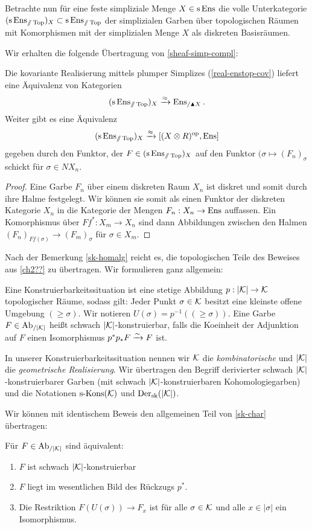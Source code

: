 Betrachte nun für eine feste simpliziale Menge $X \in \operatorname{s}\operatorname{Ens}$ die
volle Unterkategorie $(\operatorname{s}\operatorname{Ens}_{\mathbin{/\mkern-6mu/} \operatorname{Top}})_X \subset \operatorname{s}\operatorname{Ens}_{\mathbin{/\mkern-6mu/} \operatorname{Top}}$ der
simplizialen Garben über topologischen Räumen mit Komorphismen mit der
simplizialen Menge $X$ als diskreten Basisräumen.

Wir erhalten die folgende Übertragung von \ref{sheaf-simp-compl}:
\begin{prop}
  Die kovariante Realisierung mittels plumper Simplizes
  (\ref{real-enstop-cov}) liefert eine Äquivalenz von Kategorien
  \[ (\operatorname{s}\operatorname{Ens}_{\mathbin{/\mkern-6mu/} \operatorname{Top}})_X \xrightarrow{\approx} \operatorname{Ens}_{/\blacktriangle X}. \]
  Weiter gibt es eine Äquivalenz
  \[ (\operatorname{s}\operatorname{Ens}_{\mathbin{/\mkern-6mu/} \operatorname{Top}})_X \xrightarrow{\approx} [(X \otimes R)^\mathrm{op}, \operatorname{Ens}] \]
  gegeben durch den Funktor, der $F \in (\operatorname{s}\operatorname{Ens}_{\mathbin{/\mkern-6mu/} \operatorname{Top}})_X$ auf den
  Funktor $(\sigma \mapsto (F_n)_\sigma$ schickt für $\sigma \in
  NX_n$.
\end{prop}
\begin{proof}
  Eine Garbe $F_n$ über einem diskreten Raum $X_n$ ist diskret und
  somit durch ihre Halme festgelegt. Wir können sie somit als einen
  Funktor der diskreten Kategorie $X_n$ in die Kategorie der Mengen
  $F_n: X_n \to \operatorname{Ens}$ auffassen. Ein Komorphismus über $Ff^*: X_m \to
  X_n$ sind dann Abbildungen zwischen den Halmen $(F_n)_{Ff(\sigma)}
  \to (F_m)_\sigma$ für $\sigma \in X_m$.
\end{proof}


Nach der Bemerkung \ref{sk-homalg} reicht es, die topologischen Teile
des Beweises aus \ref{ch2??} zu übertragen. Wir formulieren ganz
allgemein:
\begin{defn}
  Eine Konstruierbarkeitssituation ist eine stetige Abbildung $p: |\mathcal{K}|
  \to \mathcal{K}$ topologischer Räume, sodass gilt: Jeder Punkt $\sigma \in
  \mathcal{K}$ besitzt eine kleinste offene Umgebung $(\geq \sigma)$. Wir
  notieren $U(\sigma) = p^{-1}((\geq \sigma))$. Eine Garbe $F \in
  \operatorname{Ab}_{/|\mathcal{K}|}$ heißt schwach $|\mathcal{K}|$-konstruierbar, falls die Koeinheit der
  Adjunktion auf $F$ einen Isomorphismus $p^* p_* F \xrightarrow[]{\sim} F$ ist.
\end{defn}
In unserer Konstruierbarkeitssituation nennen wir $\mathcal{K}$ die
\emph{kombinatorische} und $|\mathcal{K}|$ die \emph{geometrische
  Realisierung}. Wir übertragen den Begriff derivierter schwach
$|\mathcal{K}|$-konstruierbarer Garben (mit schwach $|\mathcal{K}|$-konstruierbaren
Kohomologiegarben) und die Notationen $\operatorname{s-Kons}(\mathcal{K})$ und $\operatorname{Der}_{\mathrm{sk}}(|\mathcal{K}|)$.

Wir können mit identischem Beweis den allgemeinen Teil von
\ref{sk-char} übertragen:
\begin{prop} \label{gensk-char}
  Für $F \in \operatorname{Ab}_{/|\mathcal{K}|}$ sind äquivalent:
  \begin{enumerate}[label=(\arabic*)]
  \item \label{itm:gensk-char-sk} $F$ ist schwach $|\mathcal{K}|$-konstruierbar
  \item \label{itm:gensk-char-essim} $F$ liegt im wesentlichen Bild
    des Rückzugs $p^*$.
  \item \label{itm:gensk-char-res} Die Restriktion $F(U(\sigma)) \to
    F_x$ ist für alle $\sigma \in \mathcal{K}$ und alle $x \in |\sigma|$ ein
    Isomorphismus.
  \end{enumerate}
\end{prop}

